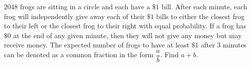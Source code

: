 $2048$ frogs are sitting in a circle and each have a $\$1$ bill. After each minute, each frog will independently give away each of their $\$1$ bills to either the closest frog to their left or the closest frog to their right with equal probability. If a frog has $\$0$ at the end of any given minute, then they will not give any money but may receive money. The expected number of frogs to have at least $\$1$ after $3$ minutes can be denoted as a common fraction in the form $\dfrac{a}{b}.$ Find $a+b.$
